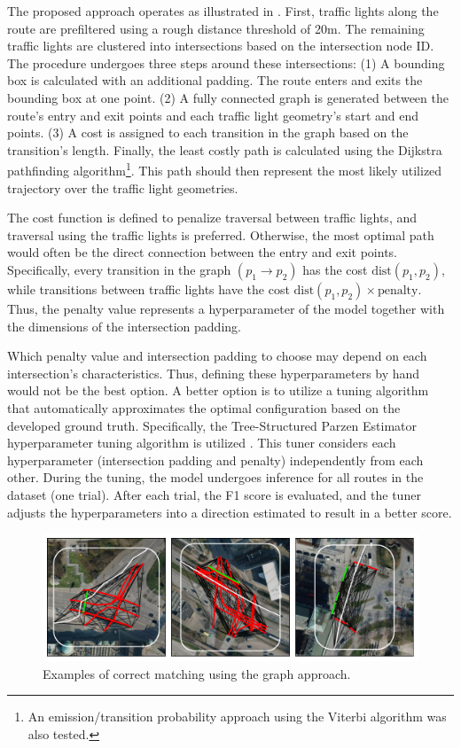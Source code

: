 The proposed approach operates as illustrated in . First, traffic lights along the route are prefiltered using a rough distance threshold of 20m. The remaining traffic lights are clustered into intersections based on the intersection node ID. The procedure undergoes three steps around these intersections: (1) A bounding box is calculated with an additional padding. The route enters and exits the bounding box at one point. (2) A fully connected graph is generated between the route's entry and exit points and each traffic light geometry's start and end points. (3) A cost is assigned to each transition in the graph based on the transition's length. Finally, the least costly path is calculated using the Dijkstra pathfinding algorithm\footnote{An emission/transition probability approach using the Viterbi algorithm was also tested.}. This path should then represent the most likely utilized trajectory over the traffic light geometries.

The cost function is defined to penalize traversal between traffic lights, and traversal using the traffic lights is preferred. Otherwise, the most optimal path would often be the direct connection between the entry and exit points. Specifically, every transition in the graph  $(p_{1} \rightarrow p_{2})$ has the cost $\text{dist}(p_{1}, p_{2})$, while transitions between traffic lights have the cost $\text{dist}(p_{1}, p_{2}) \times \text{penalty}$. Thus, the penalty value represents a hyperparameter of the model together with the dimensions of the intersection padding. 

Which penalty value and intersection padding to choose may depend on each intersection's characteristics. Thus, defining these hyperparameters by hand would not be the best option. A better option is to utilize a tuning algorithm that automatically approximates the optimal configuration based on the developed ground truth. Specifically, the Tree-Structured Parzen Estimator hyperparameter tuning algorithm is utilized \cite{ozaki_multiobjective_2020}. This tuner considers each hyperparameter (intersection padding and penalty) independently from each other. During the tuning, the model undergoes inference for all routes in the dataset (one trial). After each trial, the F1 score is evaluated, and the tuner adjusts the hyperparameters into a direction estimated to result in a better score.

\begin{figure}[t]
\centering
\includegraphics[width=\linewidth]{images/matching-dijkstra-correct.pdf}
\caption{Examples of correct matching using the graph approach.}
\label{fig:sg-selection-graph-example}
\end{figure}

